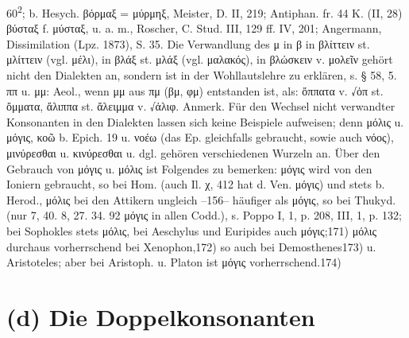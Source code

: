 60\textsuperscript{2}; b. Hesych. βόρμαξ = μύρμηξ, Meister, D. II, 219; Antiphan. fr. 44 K. (II, 28) βύσταξ f. μύσταξ, u. a. m., Roscher, C. Stud. III, 129 ff. IV, 201; Angermann, Dissimilation (Lpz. 1873), S. 35. Die Verwandlung des μ in β in βλίττειν st. μλίττειν (vgl. μέλι), in βλάξ st. μλάξ (vgl. μαλακός), in βλώσκειν v. μολεῖν gehört nicht den Dialekten an, sondern ist in der Wohllautslehre zu erklären, s. § 58, 5. ππ u. μμ: Aeol., wenn μμ aus πμ (βμ, φμ) entstanden ist, als: ὄππατα v. √ὀπ st. ὄμματα, ἄλιππα st. ἄλειμμα v. √ἀλιφ. Anmerk. Für den Wechsel nicht verwandter Konsonanten in den Dialekten lassen sich keine Beispiele aufweisen; denn μόλις u. μόγις, κοῶ b. Epich. 19 u. νοέω (das Ep. gleichfalls gebraucht, sowie auch νόος), μινύρεσθαι u. κινύρεσθαι u. dgl. gehören verschiedenen Wurzeln an. Über den Gebrauch von μόγις u. μόλις ist Folgendes zu bemerken: μόγις wird von den Ioniern gebraucht, so bei Hom. (auch Il. χ, 412 hat d. Ven. μόγις) und stets b. Herod., μόλις bei den Attikern ungleich --156-- häufiger als μόγις, so bei Thukyd. (nur 7, 40. 8, 27. 34. 92 μόγις in allen Codd.), s. Poppo I, 1, p. 208, III, 1, p. 132; bei Sophokles stets μόλις, bei Aeschylus und Euripides auch μόγις;171) μόλις durchaus vorherrschend bei Xenophon,172) so auch bei Demosthenes173) u. Aristoteles; aber bei Aristoph. u. Platon ist μόγις vorherrschend.174)
\section{(d) Die Doppelkonsonanten}

